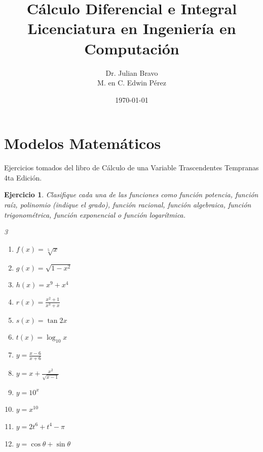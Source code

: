 \documentclass[12pt,tikz,border=5pt]{article}
\title{Cálculo Diferencial e Integral \\ Licenciatura en Ingeniería en Computación}
\author{Dr. Julian Bravo \\ M. en C. Edwin Pérez}
\date{\today}
\newtheorem{ejercicio}{Ejercicio}[section]
\begin{document}
\maketitle

\section{Modelos Matemáticos}

Ejercicios tomados del libro de Cálculo de una Variable Trascendentes Tempranas 4ta Edición\citep{stewart2001calculo}.

\begin{ejercicio}
  Clasifique cada una de las funciones como función potencia, función raíz, polinomio (indique el grado), función racional, función algebraica, función trigonométrica, función exponencial o función logarítmica.
  \begin{multicols}{3}
    \begin{enumerate}[label=(\alph*)]
      \item $f(x) = \sqrt[5]{x}$
      \item $g(x) = \sqrt{1-x^{2}}$
      \item $h(x) = x^{9} + x^{4}$
      \item $r(x) = \displaystyle\frac{x^{2} + 1}{x^{3} + x}$
      \item $s(x) = \tan{2x}$
      \item $t(x) = \log_{10}x$
      \item $y = \displaystyle\frac{x - 6}{x + 6}$
      \item $y = x + \displaystyle\frac{x^{2}}{\sqrt{x - 1}}$
      \item $y = 10^{x}$
      \item $y = x^{10}$
      \item $y = 2t^{6} + t^{4} - \pi$
      \item $y = \cos{\theta} + \sin{\theta}$
    \end{enumerate}
  \end{multicols}
\end{ejercicio}
\end{document}
